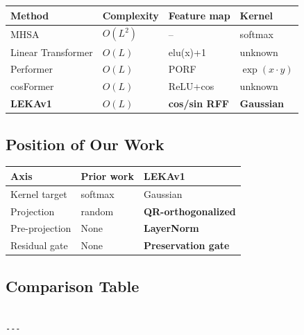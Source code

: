 \begin{table}[H]
\centering
\small
\begin{tabular}{llll}
\toprule
\textbf{Method} & \textbf{Complexity} & \textbf{Feature map} & \textbf{Kernel} \\
\midrule
MHSA & $O(L^2)$ & -- & softmax \\
Linear Transformer & $O(L)$ & elu(x)+1 & unknown \\
Performer & $O(L)$ & PORF & $\exp(x \cdot y)$ \\
cosFormer & $O(L)$ & ReLU+cos & unknown \\
\textbf{LEKAv1} & $O(L)$ & \textbf{cos/sin RFF} & \textbf{Gaussian} \\
\bottomrule
\end{tabular}
\end{table}

\subsection{Position of Our Work}

\begin{table}[H]
\centering
\small
\begin{tabular}{lll}
\toprule
\textbf{Axis} & \textbf{Prior work} & \textbf{LEKAv1} \\
\midrule
Kernel target & softmax & Gaussian \\
Projection & random & \textbf{QR-orthogonalized} \\
Pre-projection & None & \textbf{LayerNorm} \\
Residual gate & None & \textbf{Preservation gate} \\
\bottomrule
\end{tabular}
\end{table}



\subsection{Comparison Table}

\begin{lstlisting}

---
\end{lstlisting}